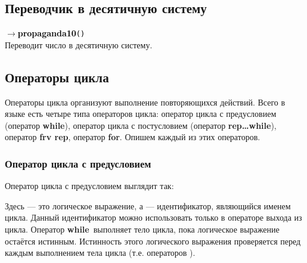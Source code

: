 \documentclass[10pt]{report}
\begin{document}
\subsection{Переводчик в десятичную систему}
$\to$\textcolor{Black}{\textbf{propaganda10}}\textcolor{Black}{\texttt{(}}\textcolor{Black}{\texttt{)}} \\
Переводит число в десятичную систему.
    \subsection{Операторы цикла}
Операторы цикла организуют выполнение повторяющихся действий. Всего в языке есть четыре типа операторов цикла: оператор цикла с предусловием (оператор \textbf{\glqq while\grqq}),
оператор цикла с постусловием (оператор \textbf{\glqq rep\dots while\grqq}), оператор \textbf{\glqq frv rep\grqq}, оператор \textbf{\glqq for\grqq}. Опишем каждый из этих операторов.
        \subsubsection{Оператор цикла с предусловием}
Оператор цикла с предусловием выглядит так:
\begin{center}
\textcolor{Green}{}
\end{center}
Здесь \textcolor{Green}{} --- это логическое выражение, а  \textcolor{Green}{} --- идентификатор, являющийся именем цикла.
Данный идентификатор можно использовать только в операторе выхода из цикла. Оператор \textbf{\glqq while\grqq}\ выполняет тело цикла, пока логическое выражение
\textcolor{Green}{} остаётся истинным. Истинность этого логического выражения проверяется перед каждым выполнением тела цикла (т.е.
операторов \textcolor{Green}{}).
\end{document}

